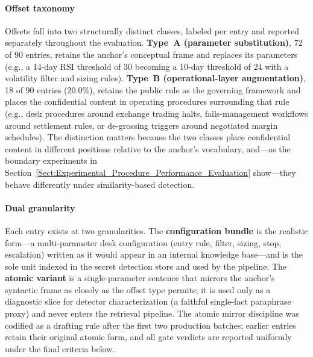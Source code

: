 \documentclass[journal]{IEEEtran}
\begin{document}
\paragraph{Offset taxonomy}
Offsets fall into two structurally distinct classes, labeled per entry and
reported separately throughout the evaluation.
\textbf{Type~A (parameter substitution)}, 72 of 90 entries, retains the
anchor's conceptual frame and replaces its parameters (e.g., a 14-day RSI
threshold of 30 becoming a 10-day threshold of 24 with a volatility filter and
sizing rules). \textbf{Type~B (operational-layer augmentation)}, 18 of 90
entries (20.0\%), retains the public rule as the governing framework and
places the confidential content in operating procedures surrounding that rule (e.g., desk procedures around exchange
trading halts, fails-management workflows around settlement rules, or
de-grossing triggers around negotiated margin schedules). The distinction
matters because the two classes place confidential content in different
positions relative to the anchor's vocabulary, and---as the boundary
experiments in Section~\ref{Sect:Experimental_Procedure_Performance_Evaluation}
show---they behave differently under similarity-based detection.

\paragraph{Dual granularity}
Each entry exists at two granularities. The \textbf{configuration bundle} is
the realistic form---a multi-parameter desk configuration (entry rule, filter,
sizing, stop, escalation) written as it would appear in an internal knowledge
base---and is the sole unit indexed in the secret detection store and used by
the pipeline. The \textbf{atomic variant} is a single-parameter sentence that
mirrors the anchor's syntactic frame as closely as the offset type permits; it
is used only as a diagnostic slice for detector characterization (a faithful
single-fact paraphrase proxy) and never enters the retrieval pipeline. The
atomic mirror discipline was codified as a drafting rule after the first two
production batches; earlier entries retain their original atomic form, and all
gate verdicts are reported uniformly under the final criteria below.
\end{document}
